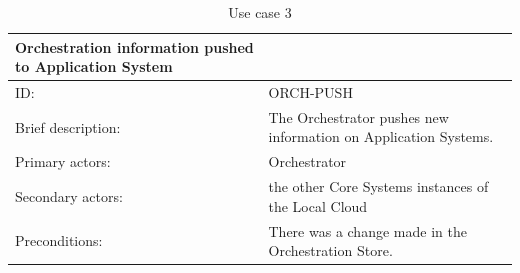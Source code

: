 \documentclass[a4paper]{arrowhead}
\begin{document}
\begin{table}[h]
	\centering
	\caption{Use case 3}
	\label{table:3}
	\begin{adjustbox}{max width=\textwidth}
	\begin{tabular}{|l|l|}
		\hline
		Orchestration information pushed to Application System &                                                                                                                                                                                                                                                                                                                                              \\ \hline
		ID:                                                    & ORCH-PUSH                                                                                                                                                                                                                                                                                                                                    \\ \hline
		Brief description:                                     & The Orchestrator pushes new information on Application Systems.                                                                                                                                                                                                                                                                              \\ \hline
		Primary actors:                                        & Orchestrator                                                                                                                                                                                                                                                                                                                                 \\ \hline
		Secondary actors:                                      & the other Core Systems instances of the Local Cloud                                                                                                                                                                                                                                                                                          \\ \hline
		Preconditions:                                         & There was a change made in the Orchestration Store.                                                                                                                                                                                                                                                                                          \\ \hline

\end{tabular}
\end{adjustbox}
\end{table}
\end{document}
